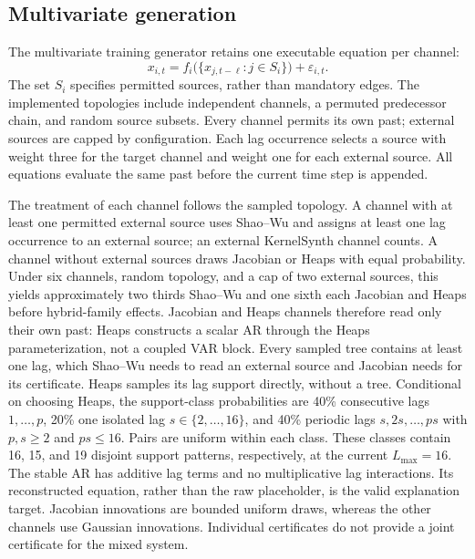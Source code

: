 \subsection{Multivariate generation}
\label{sec:multivariate-generation}

The multivariate training generator retains one executable equation per channel:
\begin{equation}
 x_{i,t}=f_i\bigl(\{x_{j,t-\ell}:j\in S_i\}\bigr)+\varepsilon_{i,t}.
\end{equation}
The set $S_i$ specifies permitted sources, rather than mandatory edges. The
implemented topologies include independent channels, a permuted predecessor
chain, and random source subsets. Every channel permits its own past; external
sources are capped by configuration. Each lag occurrence selects a source with
weight three for the target channel and weight one for each external source.
All equations evaluate the same past before the current time step is appended.

The treatment of each channel follows the sampled topology. A channel
with at least one permitted external source uses Shao--Wu and assigns at
least one lag occurrence to an external source; an external KernelSynth
channel counts. A channel without external sources draws Jacobian or Heaps
with equal probability. Under six channels, random topology, and a cap of two
external sources, this yields approximately two thirds Shao--Wu and one sixth
each Jacobian and Heaps before hybrid-family effects. Jacobian and Heaps
channels therefore read only their own past: Heaps constructs a scalar AR
through the Heaps parameterization, not a coupled VAR block. Every sampled
tree contains at least one lag, which Shao--Wu needs to read an external source
and Jacobian needs for its certificate. Heaps samples its lag support
directly, without a tree. Conditional on choosing Heaps,
the support-class probabilities are 40\% consecutive lags $1,\ldots,p$,
20\% one isolated lag $s\in\{2,\ldots,16\}$, and 40\% periodic lags
$s,2s,\ldots,ps$ with $p,s\geq2$ and $ps\leq16$. Pairs are uniform within
each class. These classes contain 16, 15, and 19 disjoint support patterns,
respectively, at the current $L_{\max}=16$.
The stable AR has additive lag terms and no multiplicative lag interactions.
Its reconstructed equation, rather than the raw placeholder, is the valid
explanation target. Jacobian innovations are bounded
uniform draws, whereas the other channels use Gaussian innovations. Individual
certificates do not provide a joint certificate for the mixed system.

